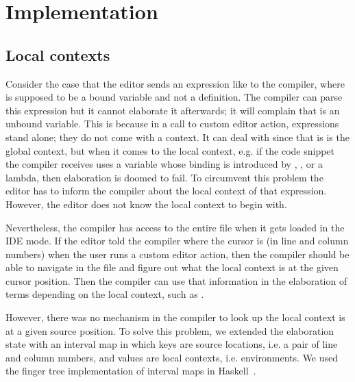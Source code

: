 \section{Implementation}\label{sec:implementation}


\subsection{Local contexts}

Consider the case that the editor sends an expression like 
to the compiler, where  is supposed to be a bound variable and not a
definition.
The compiler can parse this expression but it cannot elaborate it afterwards;
it will complain that  is an unbound variable. This is because in a
call to custom editor action, expressions stand alone; they do not come with a
context. It can deal with  since that is is the global context, but
when it comes to the local context, e.g.  if the code snippet the compiler
receives uses a variable whose binding is introduced by , , or
a lambda, then elaboration is doomed to fail.
To circumvent this problem the editor has to inform the compiler about the
local context of that expression. However, the editor does not know the local
context to begin with.

Nevertheless, the compiler has access to the entire file when it gets loaded
in the IDE mode. If the editor told the compiler where the cursor is (in line
and column numbers) when the user runs a custom editor action, then the
compiler should be able to navigate in the file and figure out what the local
context is at the given cursor position. Then the compiler can use that information
in the elaboration of terms depending on the local context, such as
.

However, there was no mechanism in the compiler to look up the local context is
at a given source position.
To solve this problem, we extended the elaboration state with an interval map
in which keys are source locations, i.e. a pair of line and column numbers, and
values are local contexts, i.e. environments. We used the finger tree
implementation of interval maps in Haskell~\cite{fingertrees}.

